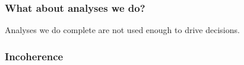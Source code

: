 \documentclass{beamer}
\begin{document}
{
\begin{frame}[plain]
\end{frame}
}

\begin{frame}
\frametitle{What about analyses we do?}
\begin{center}
\Large Analyses we do complete are not used enough to drive decisions.
\end {center}
\end{frame}

{
\begin{frame}[plain]
\frametitle{Incoherence}
\end{frame}
}
\end{document}
